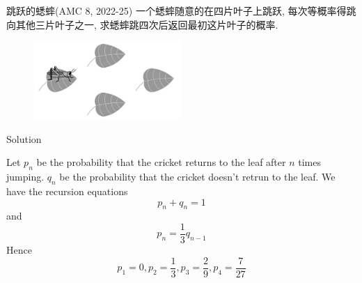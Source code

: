 \documentclass{beamer}
\theoremstyle{definition}
\begin{document}
\begin{frame}{跳跃的蟋蟀(AMC 8, 2022-25)}
    一个蟋蟀随意的在四片叶子上跳跃, 每次等概率得跳向其他三片叶子之一, 求蟋蟀跳四次后返回最初这片叶子的概率.
    \begin{figure}
        \centering
        \includegraphics[width=0.5\textwidth]{AMC8-2022-25.jpg}
    \end{figure}
\end{frame}
\begin{frame}{Solution}

    Let $p_n$ be the probability that the cricket returns to the leaf after $n$ times jumping. $q_n$ be the
    probability that the cricket doesn't retrun to the leaf.
    We have the recursion equations
    \begin{equation*}
        p_n+q_n=1
    \end{equation*}
    and
    \begin{equation*}
        p_n=\frac{1}{3}q_{n-1}
    \end{equation*}
    Hence
    \begin{equation*}
        p_1=0,p_2=\frac{1}{3},p_3=\frac{2}{9},p_4=\frac{7}{27}
    \end{equation*}
\end{frame}
\end{document}
